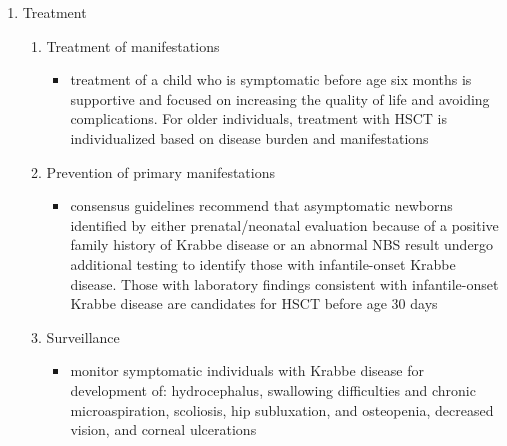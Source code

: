 \documentclass{scrartcl}
\begin{document}
\begin{enumerate}
\begin{enumerate}
\item Treatment
\label{sec:orga1862e2}
\begin{enumerate}
\item Treatment of manifestations
\label{sec:orge58a113}
\begin{itemize}
\item treatment of a child who is symptomatic before age six months is
supportive and focused on increasing the quality of life and
avoiding complications. For older individuals, treatment with HSCT
is individualized based on disease burden and manifestations
\end{itemize}

\item Prevention of primary manifestations
\label{sec:org8c44b2c}
\begin{itemize}
\item consensus guidelines recommend that asymptomatic newborns
identified by either prenatal/neonatal evaluation because of a
positive family history of Krabbe disease or an abnormal NBS
result undergo additional testing to identify those with
infantile-onset Krabbe disease. Those with laboratory findings
consistent with infantile-onset Krabbe disease are candidates for
HSCT before age 30 days
\end{itemize}

\item Surveillance
\label{sec:org5506820}
\begin{itemize}
\item monitor symptomatic individuals with Krabbe disease for
development of: hydrocephalus, swallowing difficulties and chronic
microaspiration, scoliosis, hip subluxation, and osteopenia,
decreased vision, and corneal ulcerations
\end{itemize}
\end{enumerate}
\end{enumerate}
\end{enumerate}
\end{document}
